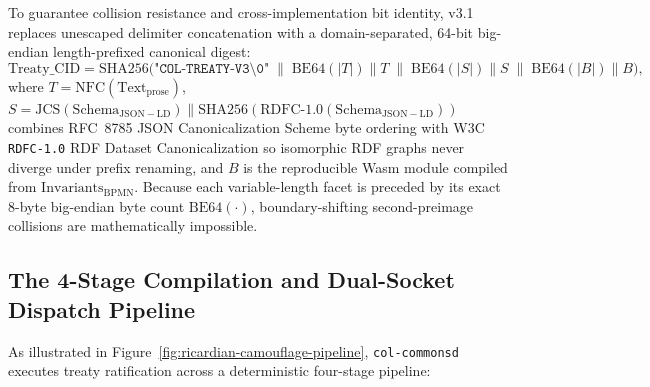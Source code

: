 To guarantee collision resistance and cross-implementation bit identity, v3.1 replaces unescaped delimiter concatenation with a domain-separated, 64-bit big-endian length-prefixed canonical digest:
\begin{equation}
  \mathrm{Treaty\_CID} = \mathrm{SHA256}\Big(
    \texttt{"COL-TREATY-V3\textbackslash0"}
    \;\parallel\; \mathrm{BE64}(|T|) \parallel T
    \;\parallel\; \mathrm{BE64}(|S|) \parallel S
    \;\parallel\; \mathrm{BE64}(|B|) \parallel B
  \Big),
  \label{eq:treaty-cid-v3}
\end{equation}
where $T = \mathrm{NFC}(\mathrm{Text}_{\mathrm{prose}})$, $S = \mathrm{JCS}(\mathrm{Schema}_{\mathrm{JSON-LD}}) \parallel \mathrm{SHA256}(\mathrm{RDFC\text{-}1.0}(\mathrm{Schema}_{\mathrm{JSON-LD}}))$ combines RFC~8785 JSON Canonicalization Scheme byte ordering \parencite{rfc8785} with W3C \texttt{RDFC-1.0} RDF Dataset Canonicalization \parencite{w3c2024rdfc} so isomorphic RDF graphs never diverge under prefix renaming, and $B$ is the reproducible Wasm module compiled from $\mathrm{Invariants}_{\mathrm{BPMN}}$. Because each variable-length facet is preceded by its exact 8-byte big-endian byte count $\mathrm{BE64}(\cdot)$, boundary-shifting second-preimage collisions are mathematically impossible.

\subsection{The 4-Stage Compilation and Dual-Socket Dispatch Pipeline}

As illustrated in Figure~\ref{fig:ricardian-camouflage-pipeline}, \texttt{col-commonsd} executes treaty ratification across a deterministic four-stage pipeline:

